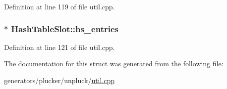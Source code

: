 Definition at line 119 of file util.\+cpp.

\hypertarget{structHashTableSlot_aa7774f3e87d521e6e1b83dee6511e3f4}{
\subsubsection[{hs\+\_\+entries}]{$\ast$ Hash\+Table\+Slot\+::hs\+\_\+entries}}\label{structHashTableSlot_aa7774f3e87d521e6e1b83dee6511e3f4}


Definition at line 121 of file util.\+cpp.



The documentation for this struct was generated from the following file\+:\begin{DoxyCompactItemize}
\item 
generators/plucker/unpluck/\hyperlink{plucker_2unpluck_2util_8cpp}{util.\+cpp}\end{DoxyCompactItemize}
